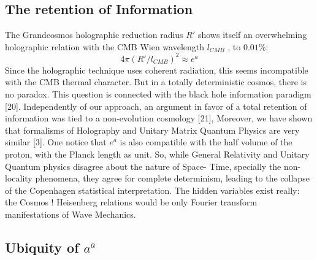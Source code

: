 \documentclass[twoside,draft]{article}
\begin{document}
\begin{sloppypar}
{\subsection{The retention of Information}

The Grandcosmos holographic reduction radius $R\prime$ shows itself an overwhelming holographic
relation with the CMB Wien wavelength $l_{CMB}$ , to $0.01\%$:
$$4\pi(R\prime/l_{CMB})^{2} \approx e^{a}$$
Since the holographic technique uses coherent radiation, this seems incompatible with the CMB
thermal character. But in a totally deterministic cosmos, there is no paradox. This question is
connected with the black hole information paradigm [20]. Independently of our approach, an
argument in favor of a total retention of information was tied to a non-evolution cosmology
[21], Moreover, we have shown that formalisms of Holography and Unitary Matrix Quantum
Physics are very similar [3]. One notice that $e^{a}$ is also compatible with the half volume of the proton, with
the Planck length as unit.
So, while General Relativity and Unitary Quantum physics disagree about the nature of Space-
Time, specially the non-locality phenomena, they agree for complete determinism, leading to the collapse of the
Copenhagen statistical interpretation. The hidden variables exist really: the Cosmos ! Heisenberg
relations would be only Fourier transform manifestations of Wave Mechanics.

\subsection{Ubiquity of $a^{a}$}

}
\end{sloppypar}
\end{document}
